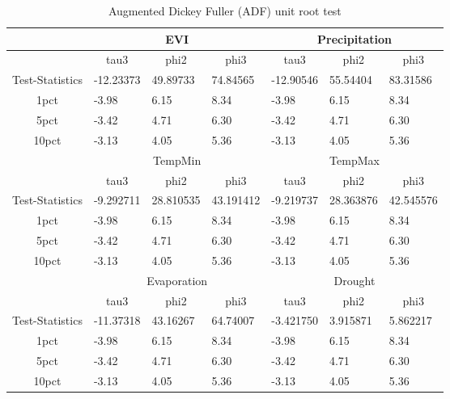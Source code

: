 \begin{table}[]
	\label{table:(ADF) unit root test}
	\caption{Augmented Dickey Fuller (ADF) unit root test }
	\centering
	\addtolength{\tabcolsep}{4pt}
	\begin{tabularx}{\textwidth}{@{}cllllll@{}}
		\toprule
		& \multicolumn{3}{c}{EVI}   & \multicolumn{3}{c}{Precipitation}  \\ \midrule
		\multicolumn{1}{c}{} & \multicolumn{1}{c}{tau3} & \multicolumn{1}{c}{phi2} & \multicolumn{1}{c}{phi3} & \multicolumn{1}{c}{tau3} & \multicolumn{1}{c}{phi2} &\multicolumn{1}{c}{phi3}\\ \midrule
		
		Test-Statistics&-12.23373&49.89733&74.84565&-12.90546&55.54404&83.31586\\
		1pct&-3.98&6.15&8.34&-3.98&6.15&8.34\\
		5pct&-3.42&4.71&6.30&-3.42&4.71&6.30\\
		10pct&-3.13&4.05&5.36&-3.13&4.05&5.36\\ \bottomrule
		& \multicolumn{3}{c}{TempMin}   & \multicolumn{3}{c}{TempMax}  \\ \midrule
		\multicolumn{1}{c}{} & \multicolumn{1}{c}{tau3} & \multicolumn{1}{c}{phi2} & \multicolumn{1}{c}{phi3} & \multicolumn{1}{c}{tau3} & \multicolumn{1}{c}{phi2} &\multicolumn{1}{c}{phi3}\\ \midrule
		
		Test-Statistics&-9.292711&28.810535&43.191412&-9.219737&28.363876&42.545576\\
		1pct&-3.98&6.15&8.34&-3.98&6.15&8.34\\
		5pct&-3.42&4.71&6.30&-3.42&4.71&6.30\\
		10pct&-3.13&4.05&5.36&-3.13&4.05&5.36\\ \bottomrule
		
		& \multicolumn{3}{c}{Evaporation}   & \multicolumn{3}{c}{Drought}  \\ \midrule
		\multicolumn{1}{c}{} & \multicolumn{1}{c}{tau3} & \multicolumn{1}{c}{phi2} & \multicolumn{1}{c}{phi3} & \multicolumn{1}{c}{tau3} & \multicolumn{1}{c}{phi2} &\multicolumn{1}{c}{phi3}\\ \midrule
		
		Test-Statistics&-11.37318&43.16267&64.74007&-3.421750&3.915871&5.862217\\
		1pct&-3.98&6.15&8.34&-3.98&6.15&8.34\\
		5pct&-3.42&4.71&6.30&-3.42&4.71&6.30\\
		10pct&-3.13&4.05&5.36&-3.13&4.05&5.36\\
		
		\midrule\bottomrule
	\end{tabularx}
\end{table}
